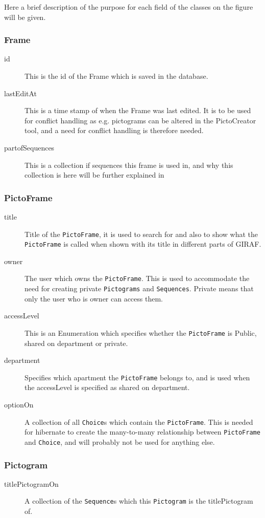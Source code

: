 Here a brief description of the purpose for each field of the classes on the figure will be given.
\subsubsection*{Frame}
	\begin{description}
		\item[id] This is the id of the Frame which is saved in the database.
		\item[lastEditAt] This is a time stamp of when the Frame was last edited. 
		It is to be used for conflict handling as e.g. pictograms can be altered in the PictoCreator tool, and a need for conflict handling is therefore needed.
		\item[partofSequences] This is a collection if sequences this frame is used in, and why this collection is here will be further explained in 
	\end{description}
\subsubsection*{PictoFrame}
	\begin{description}
		\item[title] Title of the \texttt{PictoFrame}, it is used to search for and also to show what the \texttt{PictoFrame} is called when shown with its title in different parts of GIRAF.
		\item[owner] The user which owns the \texttt{PictoFrame}. 
		This is used to accommodate the need for creating private \texttt{Pictograms} and \texttt{Sequences}.
		Private means that only the user who is owner can access them.
		\item[accessLevel] This is an Enumeration which specifies whether the \texttt{PictoFrame} is Public, shared on department or private.
		\item[department] Specifies which apartment the \texttt{PictoFrame} belongs to, and is used when the accessLevel is specified as shared on department.
		\item[optionOn] A collection of all \texttt{Choice}s which contain the \texttt{PictoFrame}.
		This is needed for hibernate to create the many-to-many relationship between \texttt{PictoFrame} and \texttt{Choice}, and will probably not be used for anything else.
	\end{description}
\subsubsection*{Pictogram}
	\begin{description}
		\item[titlePictogramOn] A collection of the \texttt{Sequence}s which this \texttt{Pictogram} is the titlePictogram of.
	\end{description}
